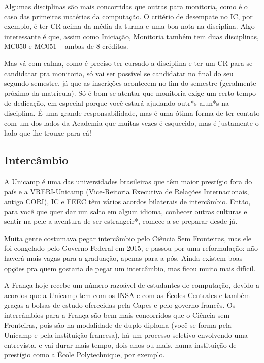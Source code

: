 Algumas disciplinas são mais concorridas que outras para monitoria, como é o
caso das primeiras matérias da computação. O critério de desempate no IC, por
exemplo, é ter CR acima da média da turma e uma boa nota na disciplina. Algo
interessante é que, assim como Iniciação, Monitoria também tem duas
disciplinas, MC050 e MC051 -- ambas de 8 créditos.

Mas vá com calma, como é preciso ter cursado a disciplina e ter um CR para se
candidatar pra monitoria, só vai ser possível se candidatar no final do seu
segundo semestre, já que as inscrições acontecem no fim do semestre (geralmente
próximo da matrícula). Só é bom se atentar que monitoria exige um certo tempo
de dedicação, em especial porque você estará ajudando outr*s alun*s na
disciplina. É uma grande responsabilidade, mas é uma ótima forma de ter contato
com um dos lados da Academia que muitas vezes é esquecido, mas é justamente o
lado que lhe trouxe para cá!

\subsection{Intercâmbio}

A Unicamp é uma das universidades brasileiras que têm maior prestígio fora do
país e a VRERI-Unicamp (Vice-Reitoria Executiva de Relações Internacionais,
antigo CORI), IC e FEEC têm vários acordos bilaterais de intercâmbio. Então,
para você que quer dar um salto em algum idioma, conhecer outras culturas e
sentir na pele a aventura de ser estrangeir*, comece a se preparar desde já.

Muita gente costumava pegar intercâmbio pelo Ciência Sem Fronteiras, mas ele
foi congelado pelo Governo Federal em 2015, e passou por uma reformulação: não
haverá mais vagas para a graduação, apenas para a pós. Ainda existem boas
opções pra quem gostaria de pegar um intercâmbio, mas ficou muito mais difícil.

A França hoje recebe um número razoável de estudantes de computação, devido a
acordos que a Unicamp tem com os INSA e com as Écoles Centrales e também graças
a bolsas de estudo oferecidas pela Capes e pelo governo francês. Os
intercâmbios para a França são bem mais concorridos que o Ciência sem
Fronteiras, pois são na modalidade de duplo diploma (você se forma pela Unicamp
e pela instituição francesa), há um processo seletivo envolvendo uma
entrevista, e vai durar mais tempo, dois anos ou mais, numa instituição de
prestígio como a École Polytechnique, por exemplo.

